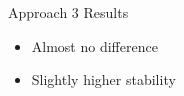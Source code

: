 \begin{frame}{Approach 3 Results}
\begin{figure}[htbp]
\begin{subfigure}[b]{0.47\textwidth}
        \label{fig:simple:final:syst}
    \end{subfigure}
    \end{figure}
        \begin{itemize}
            \item Almost no difference
            \item Slightly higher stability
        \end{itemize}
\end{frame}
